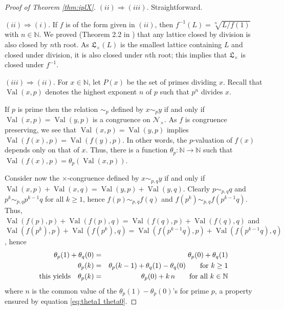\documentclass[11pt,a4paper]{article}
\theoremstyle{definition} %
\newcommand\+[1]{\mathcal{#1}} %
\newcommand{\N}{{\mathbb N}}     %
\newcommand{\Latt}{{\mathfrak{L}}}
\DeclareMathOperator{\val}{Val}%
\begin{document}
\begin{proof} [Proof of Theorem \ref{thm:iplX}]

\bigskip

$(ii)\Longrightarrow (iii)$. Straightforward.


\bigskip

$(ii)\Longrightarrow (i)$. If $f$ is of the form given in $(ii)$, 
then $f^{-1}(L)=\sqrt[n]{L/f(1)}$ with $n\in\N$.
We proved (Theorem 2.2 in \cite{cgg14ipl})   that any lattice closed by division is also closed by $n$th root. As $\Latt_{\times}(L)$ is the smallest lattice containing $L$ and closed under division, it  is also closed under $n$th root; this  implies that $\Latt_{\times}$ is closed under $f^{-1}$.


\bigskip

$(iii)\Longrightarrow (ii)$.  For $x\in\N$, let $P(x)$ be the set of primes dividing $x$.
Recall that $\val(x,p)$ denotes the
highest exponent $n$ of $p$ such that $p^n$ divides $x$.

If $p$ is prime then the relation $\sim_p$ defined by
$x \sim_p y$  if and only if  $\val(x,p)=\val(y,p)$ is a congruence on $\+N_\times$.
As $f$ is congruence preserving,
we see that $\val(x,p)=\val(y,p)$ implies $\val(f(x),p)=\val(f(y),p)$. 
In other words, the $p$-valuation of $f(x)$ depends only on that of $x$. 
Thus, there is a function $\theta_p : \N \to \N$ such that $\val(f(x),p)=\theta_p(\val(x,p))$.

Consider now the $\times$-congruence defined by 
$x \sim_{p,q} y$  if and only if  $\val(x,p)+\val(x,q)=\val(y,p)+\val(y,q)$. 
Clearly $p\sim_{p,q} q$ and $p^k \sim_{p,q} p^{k-1} q$ for all $k\geq1$, 
hence $f(p) \sim_{p,q} f(q)$ and $f(p^k)\sim_{p,q} f(p^{k-1}q)$.
Thus, $\val(f(p),p)+\val(f(p),q) = \val(f(q),p)+\val(f(q),q)$
and $\val(f(p^k),p)+\val(f(p^k),q) = \val(f(p^{k-1}q),p)+\val(f(p^{k-1}q),q)$,
hence 
\begin{eqnarray}\label{eq:theta1 theta0}
\theta_p(1)+\theta_q(0)&=&\theta_p(0)+\theta_q(1)
\\\notag
\theta_p(k)&=&\theta_p(k-1)+\theta_q(1)-\theta_q(0) \text{\qquad for $k\geq1$}
\\\label{eq:thetap}
\text{this yields\quad}\theta_p(k) &=& \theta_p(0) + k\,n  \text{\qquad for all $k\in\N$}
\end{eqnarray}
where $n$ is the common value of the $\theta_p(1) - \theta_p(0)$'s for prime $p$,
a property ensured by equation \eqref{eq:theta1 theta0}.


\end{proof}
\end{document}
